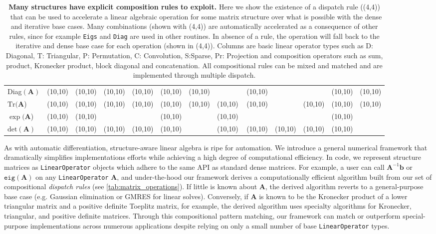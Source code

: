 \documentclass{article}
\newcommand{\bmark}{\colorbox{cyan!30}{\makebox(10,10){}}}
\newcommand{\omark}{\colorbox{purple!30}{\makebox(10,10){}}}
\newcommand{\bmarks}{\colorbox{cyan!30}{\makebox(4,4){}}}
\newcommand{\omarks}{\colorbox{purple!30}{\makebox(4,4){}}}
\newcommand{\gmark}{\colorbox{green!30}{\makebox(10,10){}}}
\newcommand{\gmarks}{\colorbox{green!30}{\makebox(4,4){}}}
\newcommand{\mbf}[1]{{\boldsymbol{\mathbf{#1}}}}
\renewcommand{\bm}{\mbf}
\begin{document}
\begin{table}[t!]
\begin{tabular}{@{}l | *{1}{c}@{}| *{6}{c}@{} | *{5}{c}@{}}
    Diag$(\bm A)$ & \gmark & \bmark &\bmark &\bmark & \bmark & \bmark & \, & \hspace{-0.7em} \bmark& &  & \bmark & \bmark \\
    $\mathrm{Tr}(\bm{A}$)  & \gmark & \omark &\omark &\omark& \omark & \omark &\bmark \, & \hspace{-0.7em} \omark& & \bmark & \omark & \omark \\
    $\exp(\bm{A}$)  & \gmark& \omark & & &\omark & & \omark \, & &  & & \omark &\\
    $\mathrm{det}(\bm A)$  & \gmark& \omark & \omark& \bmark & \omark & & \omark \, &  \hspace{-0.7em} \omark & \bmark & \omark & \omark  \\
  \bottomrule
\end{tabular}
\vspace{0.5em}
\caption{
  \textbf{Many structures have explicit composition rules to exploit.}
  Here we show the existence of a dispatch rule (\bmarks) \ that can be used to accelerate a linear algebraic operation for some matrix structure over what is possible with the dense and iterative base cases. Many combinations (shown with \omarks) are automatically accelerated as a consequence of other rules, since for example \texttt{Eigs} and \texttt{Diag} are used in other routines. In absence of a rule, the operation will fall back to the iterative and dense base case for each operation (shown in \gmarks).
  Columns are basic linear operator types such as D: Diagonal, T: Triangular, P: Permutation, C: Convolution, S:Sparse, Pr: Projection and composition operators such as sum, product, Kronecker product, block diagonal and concatenation.
  All compositional rules can be mixed and matched and are implemented through multiple dispatch.
}
\label{tab:matrix_operations}
\end{table}

As with automatic differentiation, structure-aware linear algebra is ripe for automation.
We introduce a general numerical framework that dramatically simplifies implementations efforts while achieving a high degree of computational efficiency.
In code, we represent structure matrices as \texttt{LinearOperator} objects which adhere to the same API as standard dense matrices.
For example, a user can call $\bm A^{-1} \bm b$ or $\texttt{eig}(\bm A)$ on any \texttt{LinearOperator} $\bm A$, and under-the-hood our framework derives a computationally efficient algorithm
built from our set of compositional \emph{dispatch rules} (see \autoref{tab:matrix_operations}).
If little is known about $\bm A$, the derived algorithm reverts to a general-purpose base case (e.g. Gaussian elimination or GMRES for linear solves).
Conversely, if $\bm A$ is known to be the Kronecker product of a lower triangular matrix and a positive definite Toeplitz matrix, for example, the derived algorithm uses specialty algorithms for Kronecker, triangular, and positive definite matrices.
Through this compositional pattern matching,
our framework can match or outperform special-purpose implementations across numerous applications despite relying on only a small number of base \texttt{LinearOperator} types.
\end{document}
